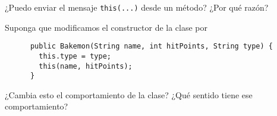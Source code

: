   \begin{exercise}
    ¿Puedo enviar el mensaje \texttt{this(...)} desde un método?
    ¿Por qué razón?
  \end{exercise}

  \begin{exercise}
    Suponga que modificamos el constructor de la clase por
    \begin{verbatim}
      public Bakemon(String name, int hitPoints, String type) {
        this.type = type;
        this(name, hitPoints);
      }
    \end{verbatim}
    ¿Cambia esto el comportamiento de la clase?
    ¿Qué sentido tiene ese comportamiento?
  \end{exercise}